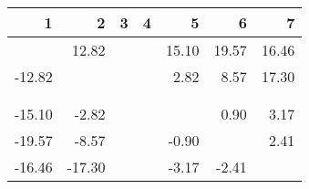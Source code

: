 \begin{table}[ht]
\centering
\begin{tabular}{rrrrrrr}
  \hline
1 & 2 & 3 & 4 & 5 & 6 & 7 \\ 
  \hline
 & 12.82 &  &  & 15.10 & 19.57 & 16.46 \\ 
  -12.82 &  &  &  & 2.82 & 8.57 & 17.30 \\ 
   &  &  &  &  &  &  \\ 
   &  &  &  &  &  &  \\ 
  -15.10 & -2.82 &  &  &  & 0.90 & 3.17 \\ 
  -19.57 & -8.57 &  &  & -0.90 &  & 2.41 \\ 
  -16.46 & -17.30 &  &  & -3.17 & -2.41 &  \\ 
   \hline
\end{tabular}
\end{table}
